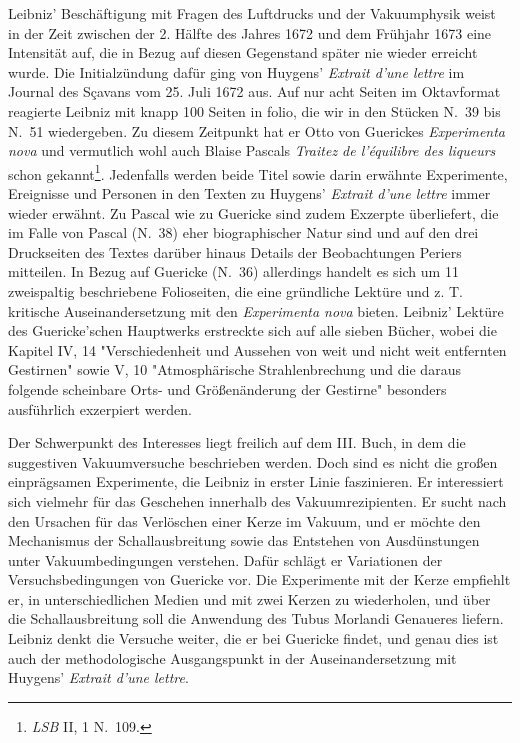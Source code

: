 Leibniz' Besch\"{a}ftigung mit Fragen des Luftdrucks und der Vakuumphysik weist in der Zeit zwischen der 2. H\"{a}lfte des Jahres 1672 und dem Fr\"{u}hjahr 1673 eine Intensit\"{a}t auf, die in Bezug auf diesen Gegenstand sp\"{a}ter nie wieder er\-reicht wurde. Die Initialz\"{u}ndung daf\"{u}r ging von Huygens' \textit{Extrait d'une lettre} im Journal des S\c{c}avans vom 25. Juli 1672 aus. Auf nur acht Seiten im Oktavformat reagierte Leibniz mit knapp 100 Seiten in folio, die wir in den St\"{u}cken N.~39 bis N.~51 wiedergeben. Zu diesem Zeitpunkt hat er Otto von Guerickes \textit{Experimenta nova} und vermutlich wohl auch Blaise Pascals \textit{Traitez de l'\'{e}quilibre des liqueurs} schon gekannt\footnote{\footnotesize \textit{LSB} II, 1 N.~109.}. Jedenfalls werden beide Titel sowie darin erw\"{a}hnte Experimente, Ereignisse und Personen in den Texten zu Huygens' \textit{Extrait d'une lettre} immer wieder erw\"{a}hnt. Zu Pascal wie zu Guericke sind zudem Exzerpte \"{u}berliefert, die im Falle von Pascal (N.~38) eher biographischer Natur sind und auf den drei Druckseiten des Textes dar\"{u}ber hinaus Details der Beobachtungen Periers mitteilen. In Bezug auf Guericke (N.~36) allerdings handelt es sich um 11 zweispaltig beschriebene Folioseiten, die eine gr\"{u}ndliche Lekt\"{u}re und z. T. kritische Auseinandersetzung mit den \textit{Experimenta nova} bieten. Leibniz' Lekt\"{u}re des Guericke'schen Hauptwerks erstreckte sich auf alle sieben B\"{u}cher, wobei die Kapitel IV, 14 "Verschiedenheit und Aussehen von weit und nicht weit entfernten Gestirnen" sowie V, 10 "Atmosph\"{a}rische Strahlenbrechung und die daraus folgende scheinbare Orts- und Gr\"{o}{\ss}en\"{a}nderung der Gestirne" besonders ausf\"{u}hrlich exzerpiert werden.\par
Der Schwerpunkt des Interesses liegt freilich auf dem III. Buch, in dem die suggestiven Vakuumversuche beschrieben werden. Doch sind es nicht die gro{\ss}en einpr\"{a}gsamen Experimente, die Leibniz in erster Linie faszinieren. Er interessiert sich vielmehr f\"{u}r das Geschehen innerhalb des Vakuumrezipienten. Er sucht nach den Ursachen f\"{u}r das Verl\"{o}schen einer Kerze im Vakuum, und er m\"{o}chte den Mechanismus der Schallausbreitung sowie das Entstehen von Aus\-d\"{u}nstungen unter Vakuumbedingungen verstehen. Daf\"{u}r schl\"{a}gt er Variationen der Versuchsbedingungen von Guericke vor. Die Experimente mit der Kerze emp\-fiehlt er, in unterschiedlichen Medien und mit zwei Kerzen zu wiederholen, und \"{u}ber die Schallausbreitung soll die Anwendung des Tubus Morlandi Genaueres liefern. Leibniz denkt die Versuche weiter, die er bei Guericke findet, und genau dies ist auch der methodologische Ausgangspunkt in der Auseinandersetzung mit Huygens' \textit{Extrait d'une lettre}.\par
